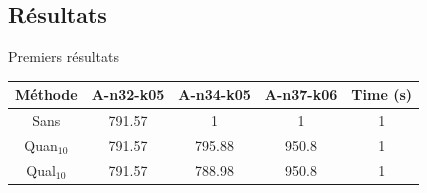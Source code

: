 \documentclass{beamer}
\begin{document}
\subsection{Résultats}

\begin{frame}{Premiers résultats}

\flushleft
\begin{tabular}{|c|c|c|c|c|}
   \hline
   Méthode & A-n32-k05 & A-n34-k05 & A-n37-k06 & Time (s)\\
   \hline
   Sans & 791.57 & 1 & 1& 1  \\
   \hline
   Quan$_{10}$ & 791.57 & 795.88 & 950.8 & 1   \\
   \hline
   Qual$_{10}$ & 791.57 & 788.98 & 950.8 & 1  \\
   \hline
\end{tabular}


\end{frame}
\end{document}
